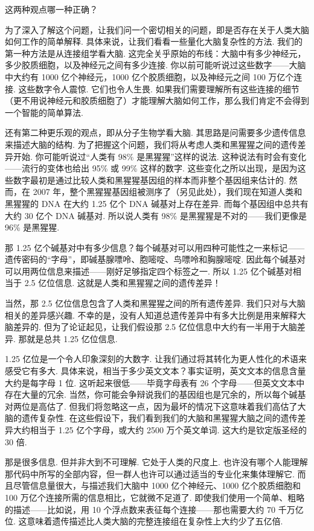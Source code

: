 这两种观点哪一种正确？

为了深入了解这个问题，让我们问一个密切相关的问题，即是否存在关于人类大脑如何工作的简单解释. 具体来说，让我们看看一些量化大脑复杂性的方法. 我们的第一种方法是从连接组学看大脑. 这完全关乎原始的布线：大脑中有多少神经元，多少胶质细胞，以及神经元之间有多少连接. 你以前可能听说过这些数字——大脑中大约有 1000 亿个神经元，1000 亿个胶质细胞，以及神经元之间 100 万亿个连接. 这些数字令人震惊. 它们也令人生畏. 如果我们需要理解所有这些连接的细节（更不用说神经元和胶质细胞了）才能理解大脑如何工作，那么我们肯定不会得到一个智能的简单算法.

还有第二种更乐观的观点，即从分子生物学看大脑. 其思路是问需要多少遗传信息来描述大脑的结构. 为了把握这个问题，我们将从考虑人类和黑猩猩之间的遗传差异开始. 你可能听说过``人类有 98\% 是黑猩猩''这样的说法. 这种说法有时会有变化——流行的变体也给出 95\% 或 99\% 这样的数字. 这些变化之所以出现，是因为这些数字最初是通过比较人类和黑猩猩基因组的样本而非整个基因组来估计的. 然而，在 2007 年，整个黑猩猩基因组被测序了（另见此处），我们现在知道人类和黑猩猩的 DNA 在大约 1.25 亿个 DNA 碱基对上存在差异. 而每个基因组中总共有大约 30 亿个 DNA 碱基对. 所以说人类有 98\% 是黑猩猩是不对的——我们更像是 96\% 是黑猩猩.

那 1.25 亿个碱基对中有多少信息？每个碱基对可以用四种可能性之一来标记——遗传密码的``字母''，即碱基腺嘌呤、胞嘧啶、鸟嘌呤和胸腺嘧啶. 因此每个碱基对可以用两位信息来描述——刚好足够指定四个标签之一. 所以 1.25 亿个碱基对相当于 2.5 亿位信息. 这就是人类和黑猩猩之间的遗传差异！

当然，那 2.5 亿位信息包含了人类和黑猩猩之间的所有遗传差异. 我们只对与大脑相关的差异感兴趣. 不幸的是，没有人知道总遗传差异中有多大比例是用来解释大脑差异的. 但为了论证起见，让我们假设那 2.5 亿位信息中大约有一半用于大脑差异. 那就是总共 1.25 亿位信息.

1.25 亿位是一个令人印象深刻的大数字. 让我们通过将其转化为更人性化的术语来感受它有多大. 具体来说，相当于多少英文文本？事实证明，英文文本的信息含量大约是每字母 1 位. 这听起来很低——毕竟字母表有 26 个字母——但英文文本中存在大量的冗余. 当然，你可能会争辩说我们的基因组也是冗余的，所以每个碱基对两位是高估了. 但我们将忽略这一点，因为最坏的情况下这意味着我们高估了大脑的遗传复杂性. 在这些假设下，我们看到我们的大脑和黑猩猩大脑之间的遗传差异大约相当于 1.25 亿个字母，或大约 2500 万个英文单词. 这大约是钦定版圣经的 30 倍.

那是很多信息. 但并非大到不可理解. 它处于人类的尺度上. 也许没有哪个人能理解那代码中所写的全部内容，但一群人也许可以通过适当的专业化来集体理解它. 而且尽管信息量很大，与描述我们大脑中 1000 亿个神经元、1000 亿个胶质细胞和 100 万亿个连接所需的信息相比，它就微不足道了. 即使我们使用一个简单、粗略的描述——比如说，用 10 个浮点数来表征每个连接——那也需要大约 70 千万亿位. 这意味着遗传描述比人类大脑的完整连接组在复杂性上大约少了五亿倍.

